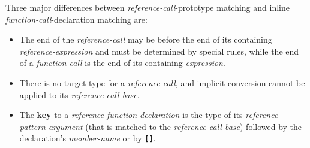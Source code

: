 \documentclass[12pt]{article}
\newcommand{\TT}[1]{{\tt \bfseries #1}}
\newcommand{\key}[1]{{\rm \bfseries #1}}
\begin{document}
Three major differences between {\em refer\-ence-call}-prototype
matching and inline {\em function-call}-declaration matching are:
\begin{itemize}
\item
The end of the {\em reference-call} may be before the end
of its containing {\em reference-expres\-sion} and must be
determined by special rules, while the
end of a {\em function-call} is the end of its containing
{\em expression}.
\item
There is no target type for a {\em reference-call}, and
implicit conversion cannot be applied to its
{\em reference-call-base}.
\item
The \key{key} to a {\em reference-function-declaration} is
the type of its {\em reference-pattern-argument} (that is
matched to the {\em reference-call-base}) followed by the
declaration's {\em member-name} or by \TT{[]}.
\end{itemize}
\end{document}
